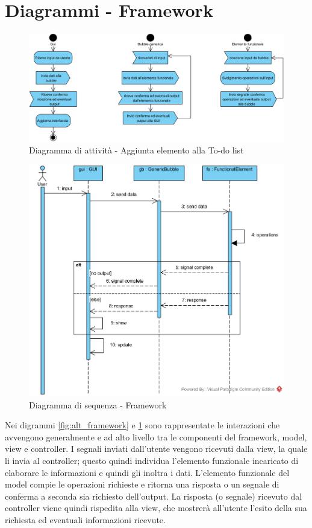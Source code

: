 \section{Diagrammi - Framework}

\begin{figure}[H]
	\centering
	\includegraphics[width=14cm]{diagrammi_img/attivita/framework.png}
	\caption{Diagramma di attività - Aggiunta elemento alla To-do list}
\end{figure}

\begin{figure}[H]
	\centering
	\includegraphics[width=14cm]{diagrammi_img/sequenza/framework.png}
	\caption{Diagramma di sequenza - Framework}
	\label{fig:seq_framework}
\end{figure}

Nei digrammi \ref{fig:alt_framework} e \ref{fig:seq_framework} sono rappresentate le interazioni che avvengono generalmente e ad alto
livello tra le componenti del framework, model, view e controller. I segnali inviati dall’utente
vengono ricevuti dalla view, la quale li invia al controller; questo quindi individua l’elemento
funzionale incaricato di elaborare le informazioni e quindi gli inoltra i dati. L’elemento funzionale
del model compie le operazioni richieste e ritorna una risposta o un segnale di conferma a seconda
sia richiesto dell’output. La risposta (o segnale) ricevuto dal controller viene quindi rispedita
alla view, che mostrerà all’utente l’esito della sua richiesta ed eventuali informazioni ricevute.